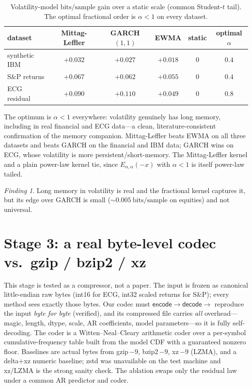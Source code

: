 \documentclass[11pt,reqno]{amsart}
\theoremstyle{plain}
\theoremstyle{definition}
\theoremstyle{remark}
\newtheorem*{finding}{Finding}
\newcommand{\bps}{\mathrm{bits/sample}}
\begin{document}
\begin{table}[h]
\centering\small
\begin{tabular}{lccccc}
\toprule
dataset & Mittag-Leffler & GARCH$(1,1)$ & EWMA & static & optimal $\alpha$\\
\midrule
synthetic IBM      & $+0.032$ & $+0.027$ & $+0.018$ & $0$ & $0.4$\\
S\&P returns       & $+0.067$ & $+0.062$ & $+0.055$ & $0$ & $0.4$\\
ECG residual       & $+0.090$ & $+0.110$ & $+0.049$ & $0$ & $0.8$\\
\bottomrule
\end{tabular}
\caption{Volatility-model $\bps$ gain over a static scale (common Student-$t$
tail). The optimal fractional order is $\alpha<1$ on every dataset.}
\label{tab:stage2}
\end{table}

The optimum is $\alpha<1$ everywhere: volatility genuinely has long memory,
including in real financial and ECG data---a clean, literature-consistent
confirmation of the memory companion. Mittag-Leffler beats EWMA on all three
datasets and beats GARCH on the financial and IBM data; GARCH wins on ECG,
whose volatility is more persistent/short-memory. The Mittag-Leffler kernel and
a plain power-law kernel tie, since $E_{\alpha,\alpha}(-x)$ with $\alpha<1$ is
itself power-law tailed.

\begin{finding}
Long memory in volatility is real and the fractional kernel captures it, but its
edge over GARCH is small ($\sim0.005~\bps$ on equities) and not universal.
\end{finding}

\section{Stage 3: a real byte-level codec vs.\ gzip / bzip2 / xz}
\label{sec:stage3}

This stage is tested as a compressor, not a paper. The input is frozen as
canonical little-endian raw bytes (int16 for ECG, int32 scaled returns for
S\&P); every method sees exactly those bytes. Our codec must
$\textsf{encode}\to\textsf{decode}\to$ reproduce the input \emph{byte for byte}
(verified), and its compressed file carries \emph{all} overhead---magic, length,
dtype, scale, AR coefficients, model parameters---so it is fully self-decoding.
The coder is a Witten--Neal--Cleary arithmetic coder over a per-symbol
cumulative-frequency table built from the model CDF with a guaranteed nonzero
floor. Baselines are actual bytes from gzip\,$-9$, bzip2\,$-9$, xz\,$-9$
(LZMA), and a delta$+$xz numeric baseline; zstd was unavailable on the test
machine and xz/LZMA is the strong sanity check. The ablation swaps only the
residual law under a common AR predictor and coder.
\end{document}
